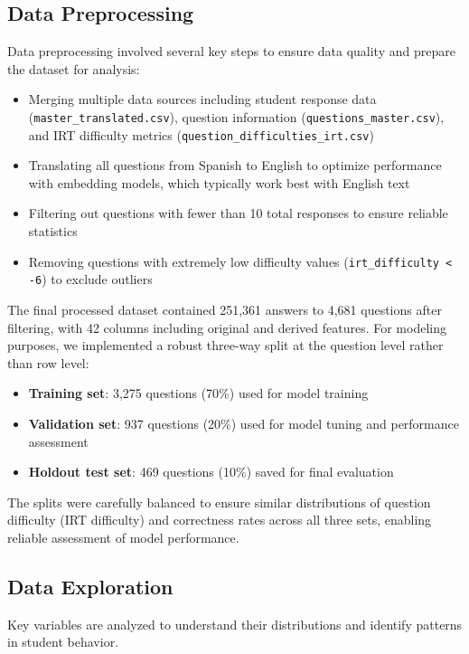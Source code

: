 \documentclass[
    a4paper, %
    10pt, %
    twoside, %
]{LTJournalArticle}
\begin{document}
\subsection{Data Preprocessing}
Data preprocessing involved several key steps to ensure data quality and prepare the dataset for analysis:
\begin{itemize}
    \item Merging multiple data sources including student response data (\texttt{master\_translated.csv}), question information (\texttt{questions\_master.csv}), and IRT difficulty metrics (\texttt{question\_difficulties\_irt.csv})
    \item Translating all questions from Spanish to English to optimize performance with embedding models, which typically work best with English text
    \item Filtering out questions with fewer than 10 total responses to ensure reliable statistics
    \item Removing questions with extremely low difficulty values (\texttt{irt\_difficulty < -6}) to exclude outliers
\end{itemize}

The final processed dataset contained 251,361 answers to 4,681 questions after filtering, with 42 columns including original and derived features. For modeling purposes, we implemented a robust three-way split at the question level rather than row level:

\begin{itemize}
    \item \textbf{Training set}: 3,275 questions (70\%) used for model training
    \item \textbf{Validation set}: 937 questions (20\%) used for model tuning and performance assessment
    \item \textbf{Holdout test set}: 469 questions (10\%) saved for final evaluation
\end{itemize}

The splits were carefully balanced to ensure similar distributions of question difficulty (IRT difficulty) and correctness rates across all three sets, enabling reliable assessment of model performance.

\subsection{Data Exploration}
Key variables are analyzed to understand their distributions and identify patterns in student behavior.
\end{document}
